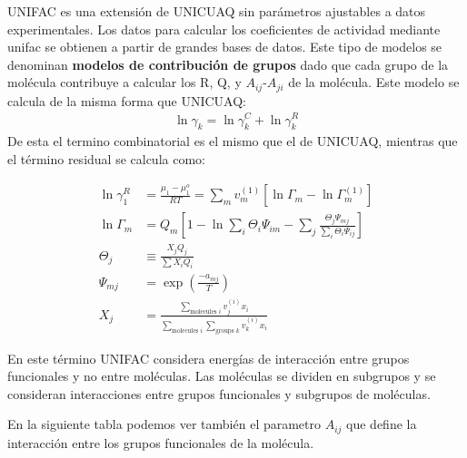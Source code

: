 
UNIFAC es una extensión de UNICUAQ sin parámetros ajustables a datos experimentales. Los datos para calcular los coeficientes de actividad mediante unifac se obtienen a partir de grandes bases de datos. Este tipo de modelos se denominan \textbf{modelos de contribución de grupos} dado que cada grupo de la molécula contribuye a calcular los R, Q, y $A_{ij}$-$A_{ji}$ de la molécula.
Este modelo se calcula de la misma forma que UNICUAQ:
\begin{align}
    \ln \gamma_k=\ln\gamma_k^{C}+\ln \gamma_k^{R}
\end{align}
De esta el termino combinatorial es el mismo que el de UNICUAQ, mientras que el término residual se calcula como:

\begin{align}
    \ln \gamma_{1}^{R}&=\frac{\mu_{1}-\mu_{1}^{o}}{R T}=\sum_{m} v_{m}^{(1)}\left[\ln \Gamma_{m}-\ln \Gamma_{m}^{(1)}\right]\\
    \ln \Gamma_{m}&=Q_{m}\left[1-\ln \sum_{i} \Theta_{i} \Psi_{i m}-\sum_{j} \frac{\Theta_{j} \Psi_{m j}}{\sum_{i} \Theta_{i} \Psi_{i j}}\right]\\
    \Theta_{j}&\equiv \frac{X_{j} Q_{j}}{\sum X_{i} Q_{i}}\\
    \Psi_{m j}&=\exp \left(\frac{-a_{m j}}{T}\right)\\
    X_{j}&=\frac{\sum_{\text {molecules } i} v_{j}^{(i)} x_{i}}{\sum_{\text {molecules } i} \sum_{\text {groups } k} v_{k}^{(i)} x_{i}}
\end{align}

En este término UNIFAC considera energías de interacción entre grupos funcionales y no entre moléculas. Las moléculas se dividen en subgrupos y se consideran interacciones
entre grupos funcionales y subgrupos de moléculas.

En la siguiente tabla podemos ver también el parametro $A_{ij}$ que define la interacción entre los grupos funcionales de la molécula.


